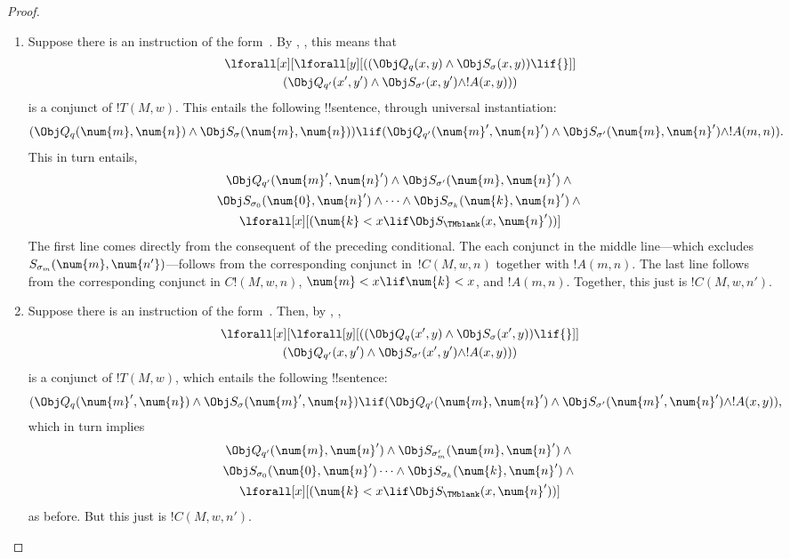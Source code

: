 \documentclass[../../../include/open-logic-section]{subfiles}
\begin{document}
\begin{proof}
\begin{enumerate} 
\item Suppose there is an instruction of the form~.
  By , , this means that
\begin{multline*} 
\lforall[x][\lforall[y][((\Obj Q_{q}(x,
    y) \land \Obj S_\sigma(x, y)) \lif {}]]\\
(\Obj Q_{q'}(x',
y') \land \Obj S_{\sigma'}(x, y') \land !A(x, y)))
\end{multline*} 
is a conjunct of $!T(M,w)$. This entails the following
!!{sentence}, through universal instantiation: 
\[ 
(\Obj Q_{q}(\num{m}, \num{n}) \land \Obj S_{\sigma}(\num{m}, \num{n}))
\lif (\Obj Q_{q'}(\num{m}', \num{n}') \land \Obj S_{\sigma'}(\num{m},
\num{n}') \land !A(m, n)).
\]
This in turn entails,
\begin{multline*}
\Obj Q_{q'}(\num{m}', \num{n}') \land \Obj S_{\sigma'}(\num{m},
\num{n}') \land {}\\
\Obj S_{\sigma_0}(\num{0}, \num{n}') \land \dots \land
\Obj S_{\sigma_k}(\num{k}, \num{n}') \land {}\\
\lforall[x][(\num{k} < x
  \lif \Obj S_\TMblank(x, \num{n}'))]
\end{multline*}
The first line comes directly from the consequent of the preceding
conditional. The each conjunct in the middle line---which excludes
$S_{\sigma_m}(\num{m},\num{n'})$---follows from the corresponding
conjunct in~$!C(M, w, n)$ together with $!A(m, n)$. The last line
follows from the corresponding conjunct in $C!(M, w, n)$, $\num{m} < x
\lif \num{k} < x$, and $!A(m, n)$.  Together, this just is $!C(M, w, n')$.

\item Suppose there is an instruction of the form~.
  Then, by , ,
\begin{multline*} 
\lforall[x][\lforall[y][((\Obj Q_{q}(x', y) \land \Obj
    S_{\sigma}(x', y)) \lif {}]]\\
(\Obj Q_{q'}(x, y') \land \Obj
S_{\sigma'}(x', y') \land !A(x, y)))
\end{multline*} 
is a conjunct of $!T(M,w)$, which entails the following !!{sentence}: 
\[ 
(\Obj Q_{q}(\num{m}', \num{n}) \land \Obj S_{\sigma}(\num{m}', \num{n})
\lif (\Obj Q_{q'}(\num{m}, \num{n}') \land \Obj S_{\sigma'}(\num{m}',
\num{n}') \land !A(x, y)),
\]
which in turn implies
\begin{multline*}
  \Obj Q_{q'}(\num{m}, \num{n}') \land \Obj S_{\sigma'_m}(\num{m},
  \num{n}') \land {}\\
  \Obj S_{\sigma_0}(\num{0}, \num{n}')\dots \land
  \Obj S_{\sigma_k}(\num{k}, \num{n}')  \land {} \\
  \lforall[x][(\num{k} < x
  \lif \Obj S_\TMblank(x, \num{n}'))]
\end{multline*}
as before. But this just is $!C(M, w, n')$.


\end{enumerate}
\end{proof}
\end{document}
